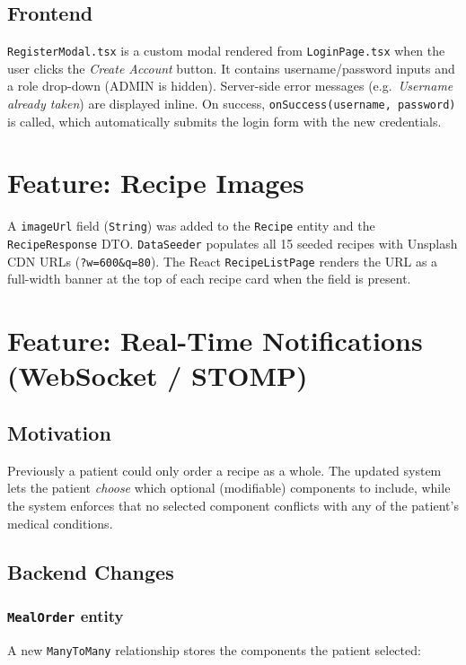 \documentclass[12pt,a4paper]{article}
\begin{document}
\subsection{Frontend}
\texttt{RegisterModal.tsx} is a custom modal rendered from \texttt{LoginPage.tsx}
when the user clicks the \emph{Create Account} button.  It contains
username/password inputs and a role drop-down (ADMIN is hidden).
Server-side error messages (e.g.\ \emph{Username already taken}) are displayed
inline.  On success, \texttt{onSuccess(username, password)} is called, which
automatically submits the login form with the new credentials.

\section{Feature: Recipe Images}

A \texttt{imageUrl} field (\texttt{String}) was added to the \texttt{Recipe}
entity and the \texttt{RecipeResponse} DTO.  \texttt{DataSeeder} populates all
15 seeded recipes with Unsplash CDN URLs (\texttt{?w=600\&q=80}).
The React \texttt{RecipeListPage} renders the URL as a full-width banner at the
top of each recipe card when the field is present.

\section{Feature: Real-Time Notifications (WebSocket / STOMP)}

\subsection{Motivation}
Previously a patient could only order a recipe as a whole.  The updated system
lets the patient \emph{choose} which optional (modifiable) components to include,
while the system enforces that no selected component conflicts with any of the
patient's medical conditions.

\subsection{Backend Changes}

\subsubsection{\texttt{MealOrder} entity}
A new \texttt{ManyToMany} relationship stores the components the patient selected:
\end{document}
